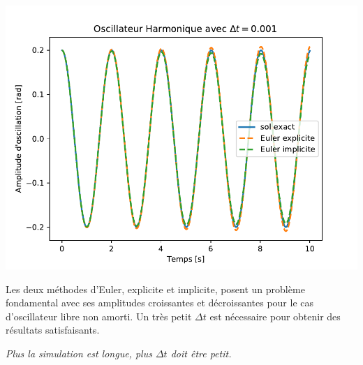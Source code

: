 \documentclass[%
oneside,                 %
final,                   %
10pt,french]{article}
\newenvironment{blockshaded}
{\def\FrameCommand{\fboxsep=3mm\colorbox{grayicon_block_background}}
 \MakeFramed {\advance\hsize-\width \FrameRestore}}{\endMakeFramed}
\newenvironment{block_grayiconadmon}[1][Block]{
\begin{blockshaded}
\noindent
 \textbf{#1}\par
\nobreak\noindent\ignorespaces
}
{
\end{blockshaded}
}
\newenvironment{doconceexercise}{}{}
\begin{document}
\begin{doconceexercise}
\centerline{\includegraphics[width=0.7\linewidth]{scripts/Pendule_illustration1.pdf}}

\vspace{6mm}




\begin{block_grayiconadmon}[Remarque]
Les deux méthodes d'Euler, explicite et implicite, posent un problème fondamental avec ses amplitudes croissantes et décroissantes pour le cas d'oscillateur libre non amorti. Un très petit $\Delta t$ est nécessaire pour obtenir des résultats satisfaisants.

\emph{Plus la simulation est longue, plus $\Delta t$ doit être petit.}
\end{block_grayiconadmon} %




\end{doconceexercise}
\end{document}

